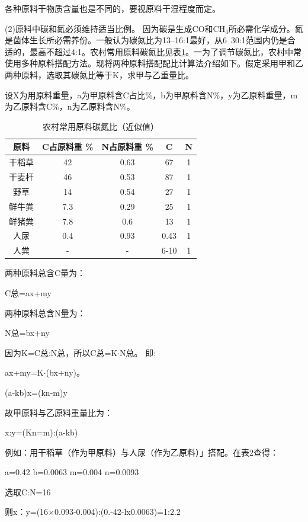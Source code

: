 \documentclass{ctexbook}
\begin{document}
各种原料干物质含量也是不同的，要视原料干湿程度而定。

(2)原料中碳和氮必须维持适当比例。
因为碳是生成CO和CH$_4$所必需化学成分。氮是菌体生长所必需养份。一般认为碳氮比为13--16:1最好，从6~30:1范围内仍是合适的，最高不超过4:1。农村常用原料碳氮比见表\ref{tab:tandanbi}。一为了调节碳氮比，农村中常使用多种原料搭配方法。现将两种原料搭配配比计算法介绍如下。假定采用甲和乙两种原料，选取其碳氮比等于K，求甲与乙重量比。

设X为用原料重量，a为甲原料含C占比\%，b为甲原料含N\%，y为乙原料重量，m为乙原料含C\%，n为乙原料含N\%。

\begin{table}[htbp]
	\centering
	\caption{农村常用原料碳氮比（近似值）}
	\begin{tabular}{c|c|c|c|c}
		\hline
		原料    &  C占原料重 \% & N占原料重 \% & C     & N \\ \hline
		干稻草   & 42    & 0.63  & 67    & 1 \\ \hline
		干麦杆   & 46    & 0.53  & 87    & 1 \\ \hline
		野草    & 14    & 0.54  & 27    & 1 \\ \hline
		鲜牛粪  & 7.3   & 0.29  & 25    & 1 \\ \hline
		鲜猪粪   & 7.8   & 0.6   & 13    & 1 \\ \hline
		人尿    & 0.4   & 0.93  & 0.43  & 1 \\ \hline
		人粪    & -     & -     & 6-10  & 1 \\ 
		\hline
	\end{tabular}%
	\label{tab:tandanbi}%
\end{table}%

两种原料总含C量为：

C总=ax+my

两种原料总含N量为：

N总=bx+ny

因为K=C总:N总，所以C总=K$\cdot$N总。
即:

ax+my=K$\cdot$(bx+ny)。

(a-kb)x=(kn-m)y

故甲原料与乙原料重量比为：

x:y=(Kn=m):(a-kb)

例如：用干稻草（作为甲原料）与人尿（作为乙原料）」搭配。在表2查得：

a=0.42 b=0.0063 m=0.004 n=0.0093

选取C:N=16

则x：y=(16$\times$0.093-0.004):(0.-42-lx0.0063)=1:2.2
\end{document}
